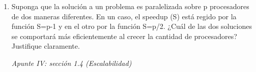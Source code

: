 \documentclass[a4paper, 10pt]{article}
\newenvironment{QandA}{
    \begin{enumerate}\bfseries}
    {\end{enumerate}
}
\newenvironment{answered}{\par\normalfont}{}
\begin{document}
\begin{QandA}
\begin{lstlisting}[multicols=2]
int request[n] = ([n] 0),
    grant[n] = ([n] 0);

Process Worker[i = 1..n]
    
# Seccion no critica ...

request[i] = 1;
while(grant[i] == 0) skip;
# Seccion Critica
grant[i] = 0;
# Seccion no critica ...
end;

Process Coordinator
while (true)
    for (j = 1; j < n; j++)
        if (request[j] == 1)
            request[j] = 0;
            grant[j] = 1;
            while (grant[j] == 1) skip;
        end;
    end;
end;
end;
\end{lstlisting}


\item Suponga que la solución a un problema es paralelizada sobre p procesadores de dos maneras diferentes.
En un caso, el speedup (S) está regido por la función S=p-1 y en el otro por la función S=p/2. ¿Cuál de las
dos soluciones se comportará más eficientemente al crecer la cantidad de procesadores? Justifique
claramente.
\begin{answered}
    \emph{Apunte IV: sección 1.4 (Escalabilidad)}
\end{answered}
\end{QandA}
\end{document}
